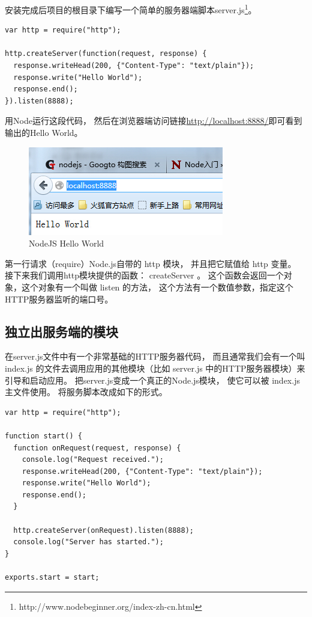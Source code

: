 \documentclass{book}
\begin{document}
安装完成后项目的根目录下编写一个简单的服务器端脚本server.js\footnote{http://www.nodebeginner.org/index-zh-cn.html}。

\begin{lstlisting}[language=VBScript]
var http = require("http");

http.createServer(function(request, response) {
  response.writeHead(200, {"Content-Type": "text/plain"});
  response.write("Hello World");
  response.end();
}).listen(8888);
\end{lstlisting}

用Node运行这段代码，
然后在浏览器端访问链接\url{http://localhost:8888/}即可看到输出的Hello World。

\begin{figure}[htbp]
	\centering
	\includegraphics[scale=1]{NodeJSFirstHelloWorld.jpg}
	\caption{NodeJS Hello World}
	\label{fig:NodeJSFirstHelloWorld}
\end{figure}

第一行请求（require）Node.js自带的 http 模块，
并且把它赋值给 http 变量。
接下来我们调用http模块提供的函数： createServer 。
这个函数会返回一个对象，这个对象有一个叫做 listen 的方法，
这个方法有一个数值参数，指定这个HTTP服务器监听的端口号。

\subsection{独立出服务端的模块}

在server.js文件中有一个非常基础的HTTP服务器代码，
而且通常我们会有一个叫 index.js 
的文件去调用应用的其他模块（比如 server.js 中的HTTP服务器模块）来引导和启动应用。
把server.js变成一个真正的Node.js模块，
使它可以被 index.js 主文件使用。
将服务脚本改成如下的形式。

\begin{lstlisting}[language=VBScript]
var http = require("http");

function start() {
  function onRequest(request, response) {
    console.log("Request received.");
    response.writeHead(200, {"Content-Type": "text/plain"});
    response.write("Hello World");
    response.end();
  }

  http.createServer(onRequest).listen(8888);
  console.log("Server has started.");
}

exports.start = start;
\end{lstlisting}
\end{document}
